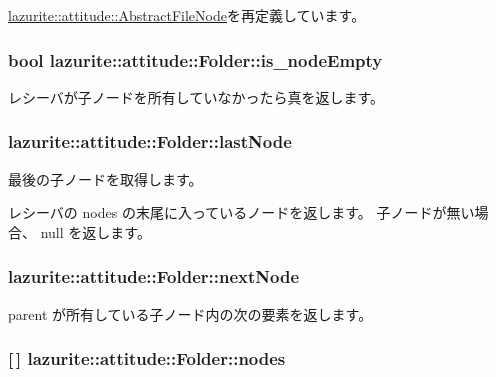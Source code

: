 \hyperlink{classlazurite_1_1attitude_1_1_abstract_file_node_aa10f20180663fe19416447c3b3486061}{lazurite::attitude::AbstractFileNode}を再定義しています。\hypertarget{classlazurite_1_1attitude_1_1_folder_ab208e46cea9f7501d8e38a1833527461}{
\subsubsection[{is\_\-nodeEmpty}]{\setlength{\rightskip}{0pt plus 5cm}bool lazurite::attitude::Folder::is\_\-nodeEmpty}}
\label{classlazurite_1_1attitude_1_1_folder_ab208e46cea9f7501d8e38a1833527461}
レシーバが子ノードを所有していなかったら真を返します。 \hypertarget{classlazurite_1_1attitude_1_1_folder_a7604ecbda454f5018a92fc5df188ced1}{
\subsubsection[{lastNode}]{ lazurite::attitude::Folder::lastNode}}
\label{classlazurite_1_1attitude_1_1_folder_a7604ecbda454f5018a92fc5df188ced1}
最後の子ノードを取得します。 
\begin{DoxyPre}
 レシーバの nodes の末尾に入っているノードを返します。
 子ノードが無い場合、 null を返します。
 \end{DoxyPre}
 \hypertarget{classlazurite_1_1attitude_1_1_folder_a05cdfb23a2433c1dc371250abab8914a}{
\subsubsection[{nextNode}]{ lazurite::attitude::Folder::nextNode}}
\label{classlazurite_1_1attitude_1_1_folder_a05cdfb23a2433c1dc371250abab8914a}
parent が所有している子ノード内の次の要素を返します。 \hypertarget{classlazurite_1_1attitude_1_1_folder_a0ca3f357b5238a0a3f0e4f930ded5a22}{
\subsubsection[{nodes}]{ \mbox{[}$\,$\mbox{]} lazurite::attitude::Folder::nodes}}
